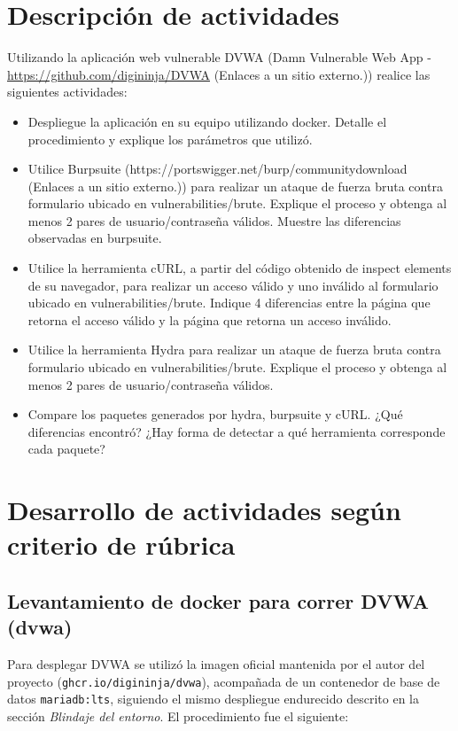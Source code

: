 \documentclass[letter,12pt]{article}
\begin{document}
\section{Descripción de actividades}
Utilizando la aplicación web vulnerable DVWA
(Damn Vulnerable Web App - \href{https://github.com/digininja/DVWA}{https://github.com/digininja/DVWA} (Enlaces a un sitio externo.)) realice las siguientes actividades:
\begin{itemize}
    \item Despliegue la aplicación en su equipo utilizando docker. Detalle el procedimiento y explique los parámetros que utilizó.
    \item Utilice Burpsuite (https://portswigger.net/burp/communitydownload (Enlaces a un sitio externo.)) para realizar un ataque de fuerza bruta contra formulario ubicado en vulnerabilities/brute. Explique el proceso y obtenga al menos 2 pares de usuario/contraseña válidos. Muestre las diferencias observadas en burpsuite.
    \item Utilice la herramienta cURL, a partir del código obtenido de inspect elements de su navegador, para realizar un acceso válido y uno inválido al formulario ubicado en vulnerabilities/brute. Indique 4 diferencias entre la página que retorna el acceso válido y la página que retorna un acceso inválido.
    \item Utilice la herramienta Hydra para realizar un ataque de fuerza bruta contra formulario ubicado en vulnerabilities/brute. Explique el proceso y obtenga al menos 2 pares de usuario/contraseña válidos.
    \item Compare los paquetes generados por hydra, burpsuite y cURL. ¿Qué diferencias encontró? ¿Hay forma de detectar a qué herramienta corresponde cada paquete?
\end{itemize}

\section{Desarrollo de actividades según criterio de rúbrica}

\subsection{Levantamiento de docker para correr DVWA (dvwa)}
Para desplegar DVWA se utilizó la imagen oficial mantenida por el autor del proyecto (\texttt{ghcr.io/digininja/dvwa}), acompañada de un contenedor de base de datos \texttt{mariadb:lts}, siguiendo el mismo despliegue endurecido descrito en la sección \emph{Blindaje del entorno}. El procedimiento fue el siguiente:
\end{document}
